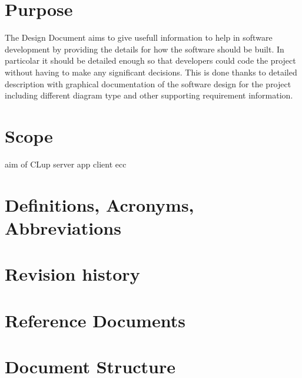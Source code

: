 \section{Purpose}
The Design Document aims to give usefull information to help in software development by providing the details for how the software should be built. In particolar it should be detailed enough so that developers could code the project without having to make any significant decisions. This is done thanks to detailed description with graphical documentation of the software design for the project including different diagram type and other supporting requirement information.
\section{Scope}
aim of CLup server app client ecc
\section{Definitions, Acronyms, Abbreviations}
\section{Revision history}
\section{Reference Documents}
\section{Document Structure}

